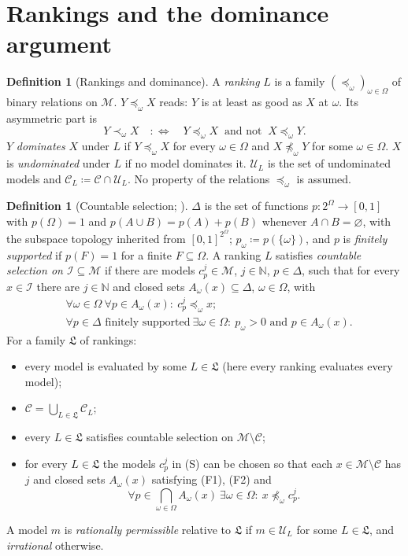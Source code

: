 \documentclass[11pt]{article}
\theoremstyle{definition}
\newtheorem{definition}[theorem]{Definition}
\newcommand{\M}{\mathcal M}
\newcommand{\C}{\mathcal C}
\newcommand{\U}{\mathcal U}
\newcommand{\Lf}{\mathfrak L}
\newcommand{\N}{\mathbb N}
\begin{document}
\section{Rankings and the dominance argument}\label{sec:ldg}

\begin{definition}[Rankings and dominance]\label{def:rankings}
A \emph{ranking} $L$ is a family $(\preceq_\omega)_{\omega\in\Omega}$ of binary relations on $\M$. $Y\preceq_\omega X$ reads: $Y$ is at least as good as $X$ at $\omega$. Its asymmetric part is
\[
Y\prec_\omega X\quad:\Longleftrightarrow\quad Y\preceq_\omega X\ \text{ and not }\ X\preceq_\omega Y .
\]
$Y$ \emph{dominates} $X$ under $L$ if $Y\preceq_\omega X$ for every $\omega\in\Omega$ and $X\not\preceq_\omega Y$ for some $\omega\in\Omega$. $X$ is \emph{undominated} under $L$ if no model dominates it. $\U_L$ is the set of undominated models and $\C_L\coloneqq\C\cap\U_L$. No property of the relations $\preceq_\omega$ is assumed.
\end{definition}

\begin{definition}[Countable selection; {\cite[Definitions~2.2 and~3.2]{LDG}}]\label{def:selection}
$\Delta$ is the set of functions $p:2^\Omega\to[0,1]$ with $p(\Omega)=1$ and $p(A\cup B)=p(A)+p(B)$ whenever $A\cap B=\varnothing$, with the subspace topology inherited from $[0,1]^{2^\Omega}$; $p_\omega\coloneqq p(\{\omega\})$, and $p$ is \emph{finitely supported} if $p(F)=1$ for a finite $F\subseteq\Omega$. A ranking $L$ satisfies \emph{countable selection on $\mathcal I\subseteq\M$} if there are models $c^j_p\in\M$, $j\in\N$, $p\in\Delta$, such that for every $x\in\mathcal I$ there are $j\in\N$ and closed sets $A_\omega(x)\subseteq\Delta$, $\omega\in\Omega$, with
\begin{align}
&\forall\omega\in\Omega\ \forall p\in A_\omega(x):\ c^j_p\preceq_\omega x;\tag{F1}\\
&\forall p\in\Delta\text{ finitely supported}\ \exists\omega\in\Omega:\ p_\omega>0\text{ and }p\in A_\omega(x).\tag{F2}
\end{align}
For a family $\Lf$ of rankings:
\begin{itemize}[leftmargin=3em]
\item[(E)] every model is evaluated by some $L\in\Lf$ (here every ranking evaluates every model);
\item[(A)] $\C=\bigcup_{L\in\Lf}\C_L$;
\item[(S)] every $L\in\Lf$ satisfies countable selection on $\M\setminus\C$;
\item[(T)] for every $L\in\Lf$ the models $c^j_p$ in (S) can be chosen so that each $x\in\M\setminus\C$ has $j$ and closed sets $A_\omega(x)$ satisfying (F1), (F2) and
\begin{equation}
\forall p\in\textstyle\bigcap_{\omega\in\Omega}A_\omega(x)\ \exists\omega\in\Omega:\ x\not\preceq_\omega c^j_p.\tag{F3}
\end{equation}
\end{itemize}
A model $m$ is \emph{rationally permissible} relative to $\Lf$ if $m\in\U_L$ for some $L\in\Lf$, and \emph{irrational} otherwise.
\end{definition}
\end{document}
